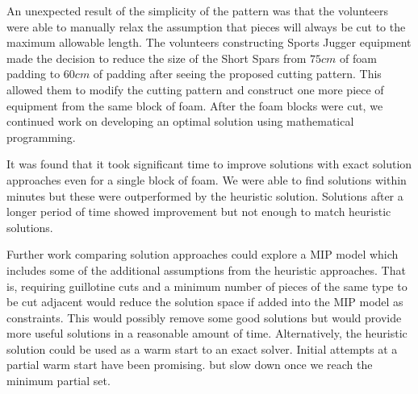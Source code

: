 \documentclass[10pt,a4paper]{article}
\begin{document}
          

An unexpected result of the simplicity of the pattern was that the volunteers were able to manually relax the assumption that pieces will always be cut to the maximum allowable length. The volunteers constructing Sports Jugger equipment made the decision to reduce the size of the Short Spars from $75cm$ of foam padding to $60cm$ of padding after seeing the proposed cutting pattern. This allowed them to modify the cutting pattern and construct one more piece of equipment from the same block of foam. After the foam blocks were cut, we continued work on developing an optimal solution using mathematical programming. 

It was found that it took significant time to improve solutions with exact solution approaches even for a single block of foam. We were able to find solutions within minutes but these were outperformed by the heuristic solution. Solutions after a longer period of time showed improvement but not enough to match heuristic solutions. 

Further work comparing solution approaches could explore a MIP model which includes some of the additional assumptions from the heuristic approaches. That is, requiring guillotine cuts and a minimum number of pieces of the same type to be cut adjacent would reduce the solution space if added into the MIP model as constraints. This would possibly remove some good solutions but would provide more useful solutions in a reasonable amount of time. Alternatively, the heuristic solution could be used as a warm start to an exact solver. Initial attempts at a partial warm start have been promising. but slow down once we reach the minimum partial set.
\end{document}

